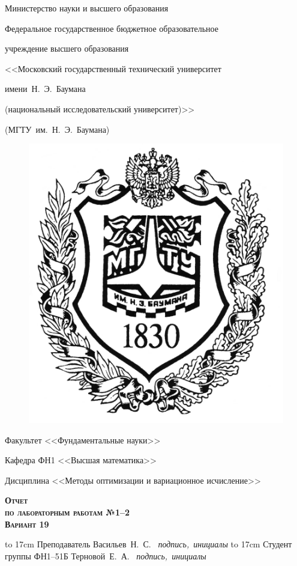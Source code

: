 \documentclass[a4paper,12pt]{extarticle}
\begin{document}
    \begin{titlepage}

        \begin{center}
            \centerline{\Large\rm Министерство науки и высшего образования}
            \centerline{\Large\rm Федеральное государственное бюджетное образовательное}
            \centerline{\Large\rm учреждение высшего образования}
            \centerline{\Large\rm <<Московский государственный технический университет}
            \centerline{\Large\rm имени~Н.~Э.~Баумана}
            \centerline{\Large\rm (национальный исследовательский университет)>>}
            \centerline{\Large\rm (МГТУ~им.~Н.~Э.~Баумана)}
            \hrulefill
        \end{center}

        \begin{figure}[h!]
            \centering
            \includegraphics[height=0.4\linewidth]{picture0}
        \end{figure}

        \begin{center}
            \centerline{\Large\rm Факультет <<Фундаментальные науки>>}
            \centerline{\Large\rm Кафедра ФН1 <<Высшая математика>>}
            \centerline{\Large\rm Дисциплина <<Методы оптимизации и вариационное исчисление>>}
        \end{center}

        \begin{center}
            \textsc{\textbf{\Huge Отчет}}\\
            \textsc{\textbf{\large по лабораторным работам №1--2}}\\
            \textsc{\textbf{\large Вариант 19}}\\
        \end{center}

        \vspace{3em}

        {
        \large
        \hbox to 17cm {Преподаватель \hspace{45pt} \hrulefill \hspace{75pt} Васильев~Н.~С.}
        \vspace{-7pt}
        \hbox{{\small\it \hspace{178pt} подпись, инициалы}}
        \hbox{}
        \hbox to 17cm {Студент группы ФН1--51Б \hrulefill \hspace{95pt} Терновой~Е.~А.}
        \vspace{-7pt}
        \hbox{{\small\it \hspace{178pt} подпись, инициалы}}
        }



\end{titlepage}
\end{document}
